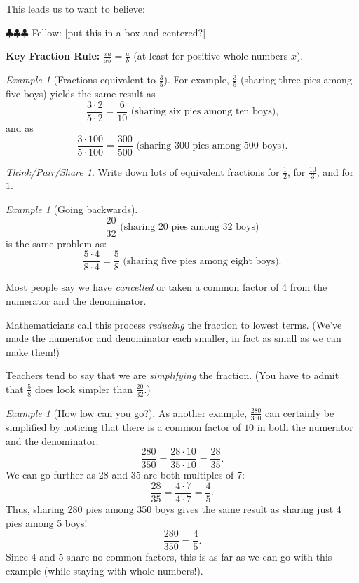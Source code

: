 \documentclass[10pt, reqno]{amsart}
\theoremstyle{remark}
\newtheorem{example}[thm]{Example}
\newtheorem*{thinkpair*}{Think/Pair/Share}
\theoremstyle{definition}
\numberwithin{equation}{section}  %
\newcommand{\fellow}[1]{{\color{magenta} \sf $\clubsuit\clubsuit\clubsuit$ Fellow: [#1]}}
\begin{document}
This leads us to want to believe:

\fellow{put this in a box and centered?}

{\bf Key Fraction Rule:} $\displaystyle \frac{xa}{xb} = \frac{a}{b}$ (at least for positive whole numbers $x$).


\begin{example}[Fractions equivalent to $\frac 35$]
 For example,
 $\frac 3 5$
(sharing three pies among five boys)
yields the same result as
 \[
 \frac{3 \cdot 2}{5 \cdot 2} = \frac{6}{10}
\text{ (sharing six pies among ten boys),}
 \]
and as
 \[
 \frac{3 \cdot 100}{5 \cdot 100} = \frac{300}{500}
\text{ (sharing 300 pies among 500 boys).}
 \]
 \end{example}
 
 
 \begin{thinkpair*}
Write down lots of equivalent fractions for $\frac 1 2$,  for $\frac {10}3$, and for~$1$.  
 \end{thinkpair*}
 
  
\begin{example}[Going backwards]
 \[
 \frac{20}{32}
\text{ (sharing 20 pies among 32 boys)}
 \]
is the same problem as:
 \[
\frac{5 \cdot 4 }{8\cdot 4} = \frac 5 8
\text{ (sharing five pies among eight boys).}
 \]
 \end{example}
 
 
Most people say we have \emph{cancelled} or taken a common factor of 4 from
the numerator and the denominator.
 
Mathematicians call this process \emph{reducing} the fraction to lowest terms. (We've
made the numerator and denominator each smaller, in fact as small as we can make them!) 
 
 Teachers tend to say that we
are \emph{simplifying} the fraction. (You have to admit that $\frac 5 8$
does look simpler than
$\frac{20}{32}$.)
 
 
 \begin{example}[How low can you go?]
 As another example,
 $\frac{280}
{350}$
can certainly be simplified by noticing that there is a
common factor of $10$ in both the numerator and the denominator:
 \[
 \frac{280}{350} = \frac{28\cdot 10}{35\cdot 10} = \frac{28}{35}.
 \]
We can go further as 28 and 35 are both multiples of 7:
 \[
 \frac{28}{35} = \frac{4 \cdot 7}{4 \cdot 7} = \frac 4 5.
 \]
Thus, sharing 280 pies among 350 boys gives the same result as sharing just 4 pies
among 5 boys!
\[
 \frac{280}{350} = \frac 4 5.
 \]
Since 4 and 5 share no common factors, this is as far as we can go with this example
(while staying with whole numbers!).
 \end{example}
 
\end{document}
